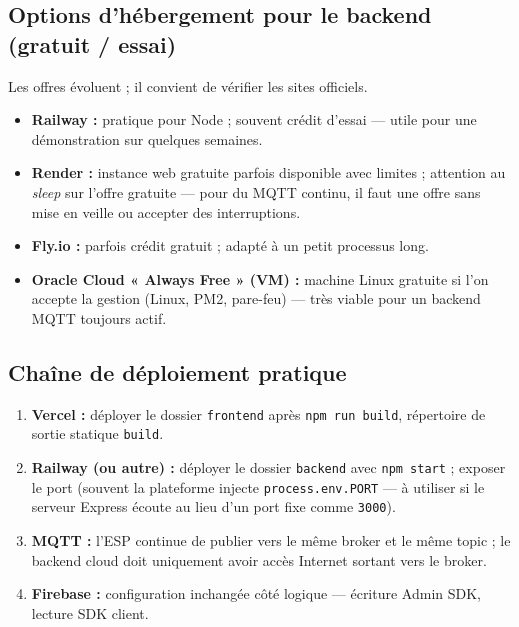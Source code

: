 \documentclass[11pt,a4paper]{article}
\begin{document}
\subsection{Options d'hébergement pour le backend (gratuit / essai)}

Les offres évoluent ; il convient de vérifier les sites officiels.

\begin{itemize}[leftmargin=*]
  \item \textbf{Railway :} pratique pour Node ; souvent crédit d'essai — utile pour une démonstration sur quelques semaines.
  \item \textbf{Render :} instance web gratuite parfois disponible avec limites ; attention au \emph{sleep} sur l'offre gratuite — pour du MQTT continu, il faut une offre sans mise en veille ou accepter des interruptions.
  \item \textbf{Fly.io :} parfois crédit gratuit ; adapté à un petit processus long.
  \item \textbf{Oracle Cloud « Always Free » (VM) :} machine Linux gratuite si l'on accepte la gestion (Linux, PM2, pare-feu) — très viable pour un backend MQTT toujours actif.
\end{itemize}

\subsection{Chaîne de déploiement pratique}

\begin{enumerate}[leftmargin=*]
  \item \textbf{Vercel :} déployer le dossier \texttt{frontend} après \texttt{npm run build}, répertoire de sortie statique \texttt{build}.
  \item \textbf{Railway (ou autre) :} déployer le dossier \texttt{backend} avec \texttt{npm start} ; exposer le port (souvent la plateforme injecte \texttt{process.env.PORT} — à utiliser si le serveur Express écoute au lieu d'un port fixe comme \texttt{3000}).
  \item \textbf{MQTT :} l'ESP continue de publier vers le même broker et le même topic ; le backend cloud doit uniquement avoir accès Internet sortant vers le broker.
  \item \textbf{Firebase :} configuration inchangée côté logique — écriture Admin SDK, lecture SDK client.
\end{enumerate}

\end{document}
